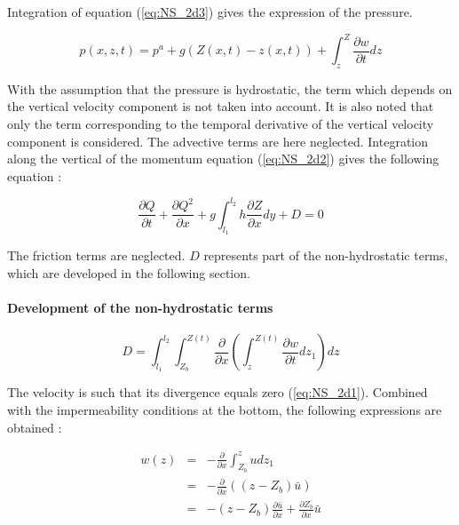 Integration of equation (\ref{eq:NS_2d3}) gives the expression of the pressure.

\begin{equation}
  p(x,z,t)=p^{a}+g(Z(x,t)-z(x,t))+\int_{z}^{Z}{\frac{\partial{w}}{\partial{t}}}dz
\end{equation}

\vspace{0.5cm}

With the assumption that the pressure is hydrostatic, the term which depends on the vertical velocity component is not taken into account. It is also noted that only the term corresponding to the temporal derivative of the vertical velocity component is considered. The advective terms are here neglected. Integration along the vertical of the momentum equation (\ref{eq:NS_2d2}) gives the following equation :

\begin{equation}
\frac{\partial{Q}}{\partial{t}}+\frac{\partial{Q^{2}}}{\partial{x}}+g\int_{l_{1}}^{l_{2}}h\frac{\partial{Z}}{\partial{x}}dy+D =0
\label{eq:mod_cont}
\end{equation}

\vspace{0.5cm}

The friction terms are neglected. $D$ represents part of the non-hydrostatic terms, which are developed in the following section.

\paragraph{Development of the non-hydrostatic terms\\}

\hspace*{1cm}

\begin{equation}
D=\int_{l_{1}}^{l_{2}}\int_{Z_{b}}^{Z(t)}{\frac{\partial}{\partial{x}}}\left(\int_{z}^{Z(t)}{\frac{\partial{w}}{\partial{t}}dz_{1}}\right)dz
\label{eq:tnh}
\end{equation}

\vspace{0.5cm}

The velocity is such that its divergence equals zero (\ref{eq:NS_2d1}). Combined with the impermeability conditions at the bottom, the following expressions are obtained :

\begin{eqnarray}
w(z) & = & - \frac{\partial}{\partial{x}}\int_{Z_{b}}^{z}udz_1\\
     & = & - \frac{\partial}{\partial{x}}((z-Z_{b})\bar{u})\\
     & = & -(z-Z_{b})\frac{\partial{\bar{u}}}{\partial{x}}+\frac{\partial{Z_b}}{\partial{x}}\bar{u}
\label{expw}
\end{eqnarray}

